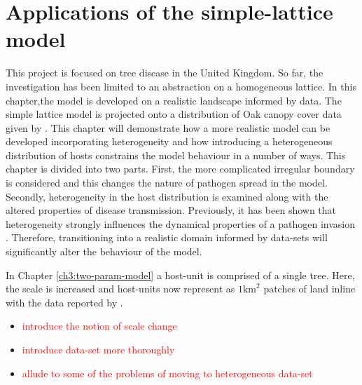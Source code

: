 
\chapter{Applications of the simple-lattice model}

This project is focused on tree disease in the United Kingdom. %
So far, the investigation has been limited to an abstraction on a homogeneous lattice. %
In this chapter,the  model is developed on  a realistic landscape informed by data. %
The simple lattice model is projected onto a distribution of Oak canopy cover data given %
by \cite{hill.data}. %
This chapter  will  demonstrate how a more realistic model can be developed %
incorporating heterogeneity and how %
introducing a heterogeneous distribution of hosts constrains the model behaviour %
in a number of ways. %
This chapter is divided into two parts. %
First, the more complicated irregular boundary is considered and this changes the nature of pathogen%
 spread in the model. %
Secondly,  heterogeneity in the host distribution is examined along with the altered properties %
of disease transmission. %
Previously, it has been shown that heterogeneity strongly influences the  dynamical properties %
of a pathogen invasion \citep{madden1995plant}. %
Therefore, transitioning into a realistic domain informed by data-sets will significantly %
alter the  behaviour of the model.  %

In Chapter \ref{ch3:two-param-model} a host-unit is comprised of a single tree. %
Here, the scale is increased and host-units now represent as  $1\mathrm{km}^2$ patches of land \textemdash inline with the data reported by \cite{hill.data}. %

\begin{itemize}
    \item \textcolor{red}{introduce the notion of scale change}
    \item \textcolor{red}{introduce data-set more thoroughly }
    \item \textcolor{red}{allude to some of the problems of moving to heterogeneous data-set}
\end{itemize}


